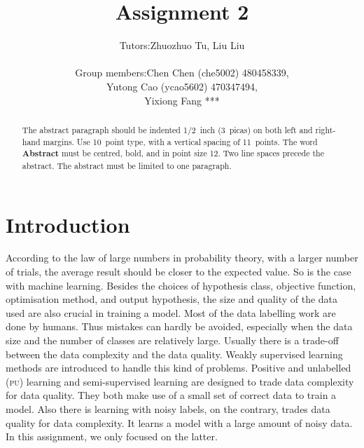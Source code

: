 \documentclass{article} %
\title{Assignment 2}
\begin{document}
\author{%
 \begin{tabular}{rl}
  Tutors: & Zhuozhuo Tu, Liu Liu\\ \\
Group members: & Chen Chen (che5002) 480458339, \\
& Yutong Cao (ycao5602) 470347494,\\
& Yixiong Fang ***
\end{tabular}
}

\maketitle



\begin{abstract}
The abstract paragraph should be indented 1/2~inch (3~picas) on both left and
right-hand margins. Use 10~point type, with a vertical spacing of 11~points.
The word \textbf{Abstract} must be centred, bold, and in point size 12. Two
line spaces precede the abstract. The abstract must be limited to one
paragraph.
\end{abstract}
\section{Introduction}
According to the law of large numbers in probability theory, with a larger number of trials, the average result should be closer to the expected value. So is the case with machine learning. Besides the choices of hypothesis class, objective function, optimisation method, and output hypothesis, the size and quality of the data used are also crucial in training a model. Most of the data labelling work are done by humans. Thus mistakes can hardly be avoided, especially when the data size and the number of classes are relatively large. Usually there is a trade-off between the data complexity and the data quality. Weakly supervised learning methods are introduced to handle this kind of problems. Positive and unlabelled (\textsc{pu}) learning and semi-supervised learning are designed to trade data complexity for data quality. They both make use of a small set of correct data to train a model. Also there is learning with noisy labels, on the contrary, trades data quality for data complexity. It learns a model with a large amount of noisy data. In this assignment, we only focused on the latter.
\end{document}
